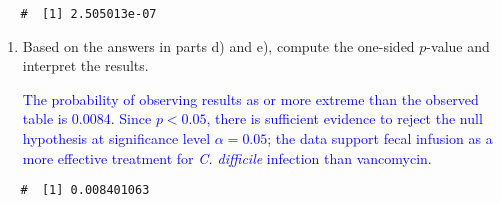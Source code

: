 \documentclass[letterpaper,12pt,twoside,]{pinp}
\begin{document}
\begin{enumerate}
  \begin{ShadedResult}
   \begin{verbatim}
   #  [1] 2.505013e-07
   \end{verbatim}
   \end{ShadedResult}

  \begin{enumerate}
  \def\labelenumii{\alph{enumii})}
  \setcounter{enumii}{5}
  \item
    Based on the answers in parts d) and e), compute the one-sided
    \(p\)-value and interpret the results.

    \textcolor{blue}{The probability of observing results as or more extreme than the observed table is 0.0084. Since $p < 0.05$, there is sufficient evidence to reject the null hypothesis at significance level $\alpha = 0.05$; the data support fecal infusion as a more effective treatment for \textit{C. difficile} infection than vancomycin.}
  \end{enumerate}

\begin{Shaded}
\begin{Highlighting}[]
\StringTok{ }\NormalTok{(}\NormalTok{, }\NormalTok{, } \OperatorTok{-}\StringTok{ }\NormalTok{, }\NormalTok{)}
\StringTok{ }\NormalTok{(}\NormalTok{, }\NormalTok{, } \OperatorTok{-}\StringTok{ }\NormalTok{, }\NormalTok{) }\OperatorTok{+}\StringTok{ }\NormalTok{(}\NormalTok{, }\NormalTok{, } \OperatorTok{-}\StringTok{ }\NormalTok{, }\NormalTok{) }\OperatorTok{+}\StringTok{ }
\StringTok{  }\NormalTok{(}\NormalTok{, }\NormalTok{, } \OperatorTok{-}\StringTok{ }\NormalTok{, }\NormalTok{)}
\OperatorTok{+}\StringTok{ }
\end{Highlighting}
\end{Shaded}

  \begin{ShadedResult}
   \begin{verbatim}
   #  [1] 0.008401063
   \end{verbatim}
   \end{ShadedResult}


\end{enumerate}
\end{document}
